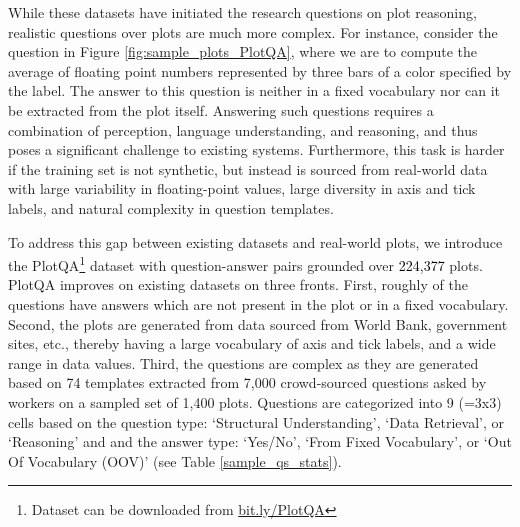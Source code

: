 \documentclass[10pt,twocolumn,letterpaper]{article}
\begin{document}
\begin{table*}[]
\begin{center}
\begin{tabular}{|l|c|c|c|c|c|c|c|c|}
\end{tabular}
\caption{}
\label{tab:comparison_data_stats}
\end{center}
\end{table*}


While these datasets have initiated the research questions on plot reasoning, realistic questions over plots are much more complex. For instance, consider the question in Figure \ref{fig:sample_plots_PlotQA}, where we are to compute the average of floating point numbers represented by three bars of a color specified by the label.
The answer to this question is neither in a fixed vocabulary nor can it be extracted from the plot itself. 
Answering such questions requires a combination of perception, language understanding, and reasoning, and thus poses a significant challenge to existing systems.
Furthermore, this task is harder if the training set is not synthetic, but instead is sourced from real-world data with large variability in floating-point values, large diversity in axis and tick labels, and natural complexity in question templates.

To address this gap between existing datasets and real-world plots, we introduce the PlotQA\footnote{Dataset can be downloaded from \url{bit.ly/PlotQA}} dataset with  question-answer pairs grounded over \textcolor{black}{224,377} plots.
PlotQA improves on existing datasets on three fronts.
First, roughly  of the questions have answers which are not present in the plot or in a fixed vocabulary. 
Second, the plots are generated from data sourced from World Bank, government sites, etc., thereby having a large vocabulary of axis and tick labels, and a wide range in data values. 
Third, the questions are complex as they are generated based on 74 templates extracted from 7,000 crowd-sourced questions asked by workers on a sampled set of 1,400 plots. 
Questions are categorized into 9 (=3x3) cells based on the question type: `Structural Understanding', `Data Retrieval', or `Reasoning' and and the answer type: `Yes/No', `From Fixed Vocabulary', or `Out Of Vocabulary (OOV)' (see Table \ref{sample_qs_stats}). 
\end{document}
